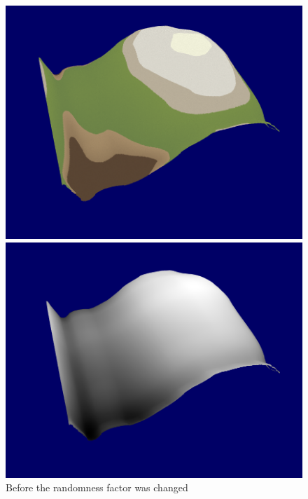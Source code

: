 \documentclass[a4paper,10pt]{report}
\begin{document}
\begin{figure}[h!]
\centering
\begin{minipage}{.4\textwidth}
  \centering
  \includegraphics[width=.9\linewidth]{Images/Sprint-Images/Sprint-7-Before-Colour.png}
    \end{minipage}%
\begin{minipage}{.4\textwidth}
  \centering
  \includegraphics[width=.9\linewidth]{Images/Sprint-Images/Sprint-7-Before-Greyscale.png}
\end{minipage}
\caption{Before the randomness factor was changed}
\label{before-random}
\end{figure}
\end{document}
